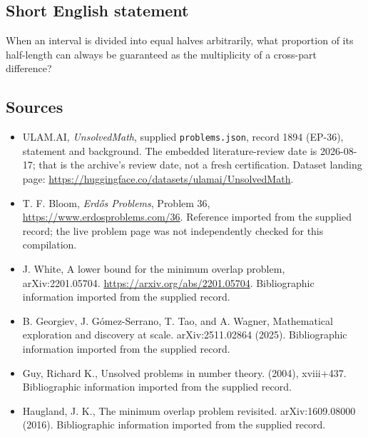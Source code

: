 \documentclass[11pt,a4paper]{article}
\begin{document}
\subsection{Short English statement}

When an interval is divided into equal halves arbitrarily, what proportion of its half-length can always be guaranteed as the multiplicity of a cross-part difference?

\subsection{Sources}

{\small

\begin{itemize}

\item[\hypertarget{source:1894:1}{S1}] ULAM.AI, \emph{UnsolvedMath}, supplied \texttt{problems.json}, record 1894 (EP-36), statement and background. The embedded literature-review date is 2026-08-17; that is the archive’s review date, not a fresh certification. Dataset landing page: \url{https://huggingface.co/datasets/ulamai/UnsolvedMath}.

\item[\hypertarget{source:1894:2}{S2}] T. F. Bloom, \emph{Erdős Problems}, Problem 36, \url{https://www.erdosproblems.com/36}. Reference imported from the supplied record; the live problem page was not independently checked for this compilation.

\item[\hypertarget{source:1894:3}{S3}] J. White, A lower bound for the minimum overlap problem, arXiv:2201.05704. \url{https://arxiv.org/abs/2201.05704}. Bibliographic information imported from the supplied record.

\item[\hypertarget{source:1894:4}{S4}] B. Georgiev, J. G\'{o}mez-Serrano, T. Tao, and A. Wagner, Mathematical exploration and discovery at scale. arXiv:2511.02864 (2025). Bibliographic information imported from the supplied record.

\item[\hypertarget{source:1894:5}{S5}] Guy, Richard K., Unsolved problems in number theory. (2004), xviii+437. Bibliographic information imported from the supplied record.

\item[\hypertarget{source:1894:6}{S6}] Haugland, J. K., The minimum overlap problem revisited. arXiv:1609.08000 (2016). Bibliographic information imported from the supplied record.

\end{itemize}

}

\label{end:1894}
\end{document}
